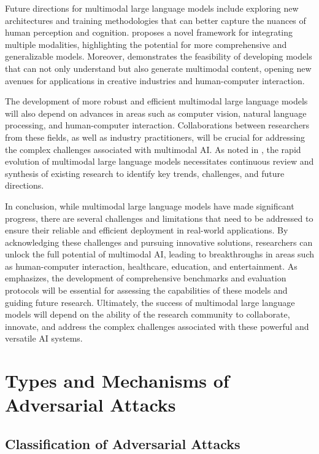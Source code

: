 \documentclass[11pt,a4paper]{article}
\begin{document}
Future directions for multimodal large language models include exploring new architectures and training methodologies that can better capture the nuances of human perception and cognition. \cite{arxiv:2306.09093} proposes a novel framework for integrating multiple modalities, highlighting the potential for more comprehensive and generalizable models. Moreover, \cite{arxiv:2309.11499} demonstrates the feasibility of developing models that can not only understand but also generate multimodal content, opening new avenues for applications in creative industries and human-computer interaction.

The development of more robust and efficient multimodal large language models will also depend on advances in areas such as computer vision, natural language processing, and human-computer interaction. Collaborations between researchers from these fields, as well as industry practitioners, will be crucial for addressing the complex challenges associated with multimodal AI. As noted in \cite{arxiv:2409.18991}, the rapid evolution of multimodal large language models necessitates continuous review and synthesis of existing research to identify key trends, challenges, and future directions.

In conclusion, while multimodal large language models have made significant progress, there are several challenges and limitations that need to be addressed to ensure their reliable and efficient deployment in real-world applications. By acknowledging these challenges and pursuing innovative solutions, researchers can unlock the full potential of multimodal AI, leading to breakthroughs in areas such as human-computer interaction, healthcare, education, and entertainment. As \cite{arxiv:2409.18142} emphasizes, the development of comprehensive benchmarks and evaluation protocols will be essential for assessing the capabilities of these models and guiding future research. Ultimately, the success of multimodal large language models will depend on the ability of the research community to collaborate, innovate, and address the complex challenges associated with these powerful and versatile AI systems.


\section{Types and Mechanisms of Adversarial Attacks}



\subsection{Classification of Adversarial Attacks}
\end{document}
